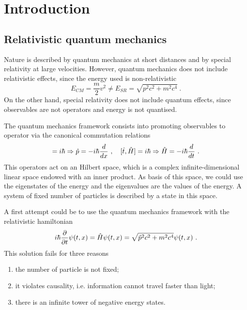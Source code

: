 \part{Introduction}

\chapter{Relativistic quantum mechanics}

    Nature is described by quantum mechanics at short distances and by special relativity at large velocities. However, quantum mechanics does not include relativistic effects, since the energy used is non-relativistic
    \begin{equation*}
        E_{CM} = \frac{m}{2} v^2 \neq E_{SR} = \sqrt{p^2 c^2 + m^2 c^4} ~.
    \end{equation*}
    On the other hand, special relativity does not include quantum effects, since observables are not operators and energy is not quantised.

    The quantum mechanics framework consists into promoting observables to operator via the canonical commutation relations 
    \begin{equation*}
        [\hat x, \hat p] = i \hbar \Rightarrow \hat p = - i \hbar \dv{}{x} ~, \quad [\hat t, \hat H] = i \hbar \Rightarrow \hat H = - i \hbar \dv{}{t} ~.
    \end{equation*}
    This operators act on an Hilbert space, which is a complex infinite-dimensional linear space endowed with an inner product. As basis of this space, we could use the eigenstates of the energy and the eigenvalues are the values of the energy. A system of fixed number of particles is described by a state in this space.

    A first attempt could be to use the quantum mechanics framework with the relativistic hamiltonian 
    \begin{equation*}
        i \hbar \frac{\partial}{\partial t} \psi(t, x) = \hat H \psi(t, x) = \sqrt{\hat p^2 c^2 + m^2 c^4} \psi(t, x) ~.
    \end{equation*}
    This solution fails for three reasons
    \begin{enumerate}
        \item the number of particle is not fixed;
        \item it violates causality, i.e. information cannot travel faster than light;
        \item there is an infinite tower of negative energy states.
    \end{enumerate}

